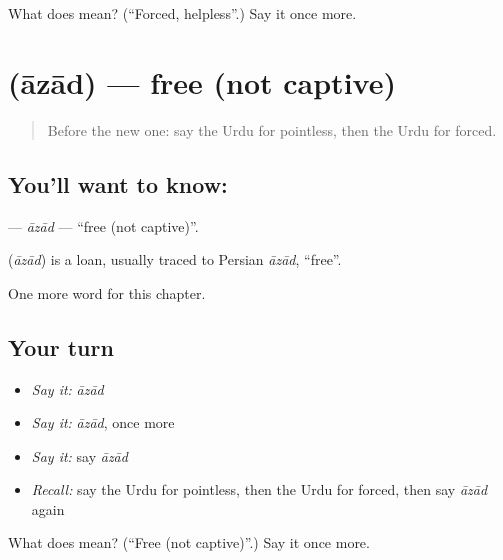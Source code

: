 \begin{tcolorbox}[breakable,colback=teal!4,colframe=teal!35!black,title={Before you move on}]
What does  mean? (\textquotedblleft{}Forced, helpless\textquotedblright{}.) Say it once more.
\end{tcolorbox}
\section[\texorpdfstring{\ur{آزاد} (āzād)}{آزاد (āzād)}]{ (āzād) — free (not captive)}

\label{lesson:UR-C163-azad}



\begin{quote}
Before the new one: say the Urdu for pointless, then the Urdu for forced.
\end{quote}

\subsection*{You'll want to know: }
\textbf{} — \emph{āzād} — \textquotedblleft{}free (not captive)\textquotedblright{}.

\begin{cousinweb}
\textbf{} (\emph{āzād}) is a loan, usually traced to Persian \emph{āzād}, \textquotedblleft{}free\textquotedblright{}.
\end{cousinweb}

\begin{grammarlens}[title={What you've built}]
One more word for this chapter.
\end{grammarlens}

\subsection*{Your turn}
\begin{itemize}
\raggedright
  \item \emph{Say it:} \emph{āzād}
  \item \emph{Say it:} \emph{āzād}, once more
  \item \emph{Say it:} say \emph{āzād}
  \item \emph{Recall:} say the Urdu for pointless, then the Urdu for forced, then say \emph{āzād} again
\end{itemize}

\begin{tcolorbox}[breakable,colback=teal!4,colframe=teal!35!black,title={Before you move on}]
What does  mean? (\textquotedblleft{}Free (not captive)\textquotedblright{}.) Say it once more.
\end{tcolorbox}
